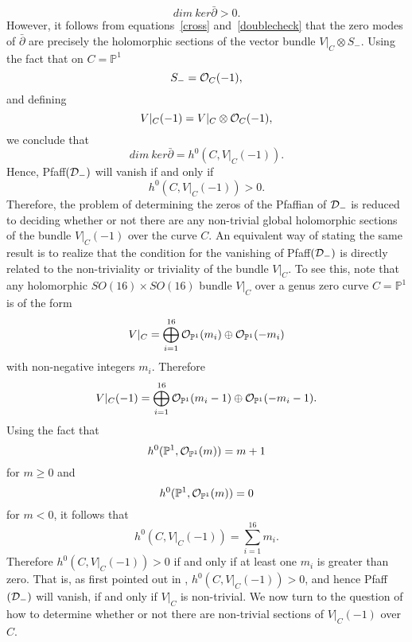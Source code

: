 \documentclass[a4paper,12pt]{article}
\numberwithin{equation}{section}
\theoremstyle{plain}
\begin{document}
%
\begin{equation}
dim{\ } ker \bar \partial >0.
\label{25}
\end{equation}
%
However, it follows from equations~\eqref{cross} and~\eqref{doublecheck}
that
the zero modes of $\bar \partial$ are precisely the holomorphic sections
of the vector bundle $V|_{C} \otimes S_{-}$. Using the fact that
on $C={\mathbb P}^1$
%
\begin{equation}
S_{-} ={\cal O}_{C}(-1),
\label{26}
\end{equation}
%
and defining
%
\begin{equation}
V|_C (-1) =  V|_{C} \otimes {\cal O}_{C}(-1),
\label{27}
\end{equation}
%
we conclude that
%
\begin{equation}
dim{\ } ker \bar \partial = h^{0} (C, V|_{C} (-1)).
\label{28}
\end{equation}
Hence, Pfaff$({\cal D}_{-})$ will vanish if and only if
%
\begin{equation}
h^{0} (C, V|_{C} (-1))>0.
\label{29}
\end{equation}
%
Therefore, the problem of determining the zeros of the Pfaffian
of ${\cal D}_{-}$ is reduced to deciding whether or not there are
any
non-trivial global holomorphic sections of the bundle $V|_{C}(-1)$ over
the
curve $C$. An equivalent way of stating the same result is to realize that
the condition for the vanishing of Pfaff$({\cal D}_{-})$ is directly
related
to the non-triviality or triviality of the bundle $V|_{C}$. To see this,
note
that any holomorphic $SO(16) \times SO(16)$ bundle $V|_{C}$ over a genus
zero
curve $C ={\mathbb P}^{1}$ is of the form
%
\begin{equation}
V|_{C} = \bigoplus_{i=1}^{16} {\cal O}_{{\mathbb P}^{1}}(m_i) \oplus
{\cal O}_{{\mathbb P}^{1}}(-m_i)
\label{30}
\end{equation}
%
with non-negative integers $m_i$. Therefore
%
\begin{equation}
V|_{C}(-1) = \bigoplus_{i=1}^{16} {\cal O}_{{\mathbb P}^{1}}(m_i-1)
\oplus {\cal O}_{{\mathbb P}^{1}}(-m_i-1).
\label{31}
\end{equation}
%
Using the fact that
%
\begin{equation}
h^{0}({\mathbb P}^1, {\cal O}_{{\mathbb P}^1} (m)) = m+1
\label{alpha}
\end{equation}
%
for $m \geq 0$ and
%
\begin{equation}
h^{0}({\mathbb P}^1, {\cal O}_{{\mathbb P}^1} (m)) = 0
\label{beta}
\end{equation}
%
for $m < 0$, it follows that
%
\begin{equation}
h^{0} (C, V|_{C} (-1))= \sum_{i=1}^{16} m_i.
\label{32}
\end{equation}
%
Therefore  $h^{0} (C, V|_{C} (-1))>0$ if and only if at least one $m_i$
is greater than zero. That is, as first pointed out in
\cite{Witten2},
$h^{0} (C, V|_{C} (-1))>0$, and hence Pfaff$({\cal D}_{-})$ will vanish,
if and only if $V|_{C}$ is non-trivial.
We now turn to the question of how to determine whether or not there are
non-trivial sections of $V|_{C}(-1)$ over $C$.
\end{document}
